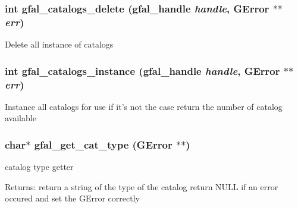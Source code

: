 \subsubsection{\setlength{\rightskip}{0pt plus 5cm}int gfal\_\-catalogs\_\-delete (gfal\_\-handle {\em handle}, GError $\ast$$\ast$ {\em err})}\label{gfal__common__catalog_8h_405974336e7b4ebaafeea02577d7d4d5}


Delete all instance of catalogs 
\subsubsection{\setlength{\rightskip}{0pt plus 5cm}int gfal\_\-catalogs\_\-instance (gfal\_\-handle {\em handle}, GError $\ast$$\ast$ {\em err})}\label{gfal__common__catalog_8h_d272f75eb549a72064524ecce3c25fe7}


Instance all catalogs for use if it's not the case return the number of catalog available 
\subsubsection{\setlength{\rightskip}{0pt plus 5cm}char$\ast$ gfal\_\-get\_\-cat\_\-type (GError $\ast$$\ast$)}\label{gfal__common__catalog_8h_791ad55a9c8aaca0bb8ae74a3538c202}


catalog type getter 

\begin{Desc}
\item[Returns:]return a string of the type of the catalog return NULL if an error occured and set the GError correctly \end{Desc}
